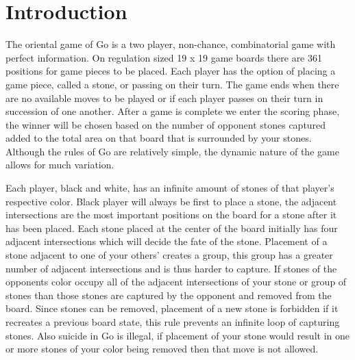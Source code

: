\documentclass[conference]{IEEEtran}
\begin{document}
\section{Introduction}
The oriental game of Go is a two player, non-chance, combinatorial game with perfect information. On regulation sized 19 x 19 game boards there are 361 positions for game pieces to be placed. Each player has the option of placing a game piece, called a stone, or passing on their turn. The game ends when there are no available moves to be played or if each player passes on their turn in succession of one another. After a game is complete we enter the scoring phase, the winner will be chosen based on the number of opponent stones captured added to the total area on that board that is surrounded by your stones. Although the rules of Go are relatively simple, the dynamic nature of the game allows for much variation.\par
Each player, black and white, has an infinite amount of stones of that player's respective color. Black player will always be first to place a stone, the adjacent intersections are the most important positions on the board for a stone after it has been placed. Each stone placed at the center of the board initially has four adjacent intersections which will decide the fate of the stone. Placement of a stone adjacent to one of your others' creates a group, this group has a greater number of adjacent intersections and is thus harder to capture. If stones of the opponents color occupy all of the adjacent intersections of your stone or group of stones than those stones are captured by the opponent and removed from the board. Since stones can be removed, placement of a new stone is forbidden if it recreates a previous board state, this rule prevents an infinite loop of capturing stones. Also suicide in Go is illegal, if placement of your stone would result in one or more stones of your color being removed then that move is not allowed.
\end{document}

